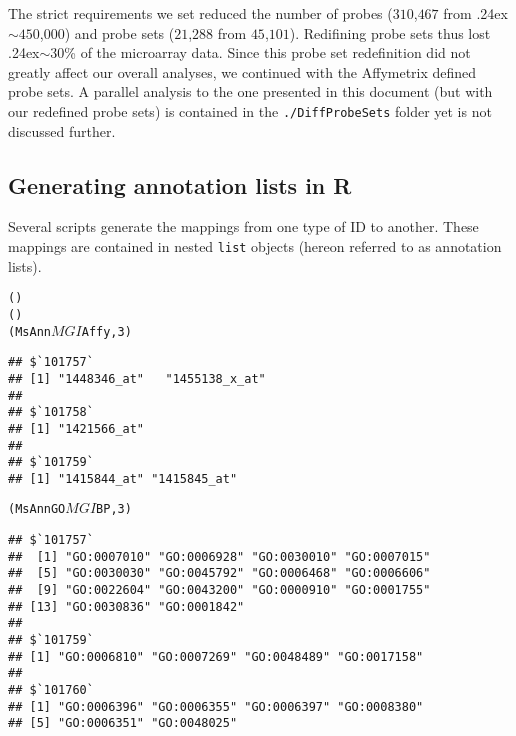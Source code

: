 The strict requirements we set reduced the number of
probes ($310$,$467$ from {\raise.24ex\hbox{$\scriptstyle\sim$}}$450$,$000$) 
and probe sets ($21$,$288$ from $45$,$101$). Redifining probe sets 
thus lost {\raise.24ex\hbox{$\scriptstyle\sim$}}30\% of the microarray data. 
Since this probe set redefinition did not greatly affect our overall 
analyses, we continued with the Affymetrix
defined probe sets. A parallel analysis to the one presented in this document
(but with our redefined probe sets) is contained in the
\texttt{./DiffProbeSets} folder yet is not discussed further.

\subsection{Generating annotation lists in R}

Several scripts generate the mappings from one type of 
ID to another. These mappings are contained in 
nested \texttt{list} objects (hereon referred to as annotation
lists).

\begin{knitrout}
\color{fgcolor}\begin{kframe}
\begin{alltt}
()
()
(MsAnn$MGI$Affy, 3)
\end{alltt}
\begin{verbatim}
## $`101757`
## [1] "1448346_at"   "1455138_x_at"
## 
## $`101758`
## [1] "1421566_at"
## 
## $`101759`
## [1] "1415844_at" "1415845_at"
\end{verbatim}
\begin{alltt}
(MsAnnGO$MGI$BP, 3)
\end{alltt}
\begin{verbatim}
## $`101757`
##  [1] "GO:0007010" "GO:0006928" "GO:0030010" "GO:0007015"
##  [5] "GO:0030030" "GO:0045792" "GO:0006468" "GO:0006606"
##  [9] "GO:0022604" "GO:0043200" "GO:0000910" "GO:0001755"
## [13] "GO:0030836" "GO:0001842"
## 
## $`101759`
## [1] "GO:0006810" "GO:0007269" "GO:0048489" "GO:0017158"
## 
## $`101760`
## [1] "GO:0006396" "GO:0006355" "GO:0006397" "GO:0008380"
## [5] "GO:0006351" "GO:0048025"
\end{verbatim}
\end{kframe}
\end{knitrout}

